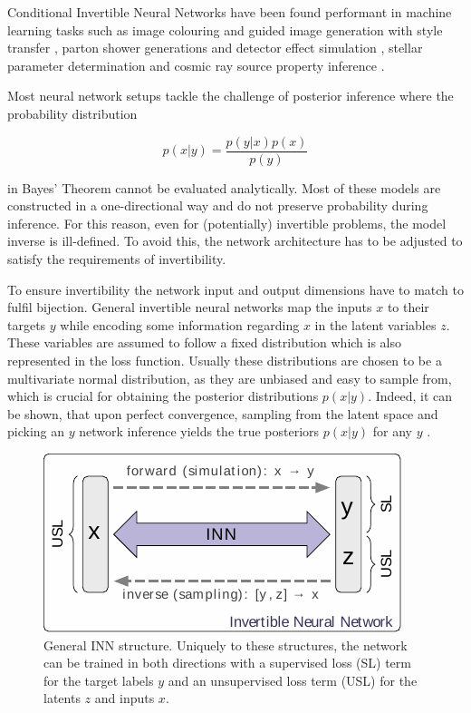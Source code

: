 
Conditional Invertible Neural Networks have been found performant in machine learning tasks such as image colouring and guided image generation with style transfer \cite{cINN_im_gen}, parton shower generations and detector effect simulation \cite{Bellagente_2020}, stellar parameter determination \cite{Ksoll_2020} and cosmic ray source property inference \cite{Bister_2022}.

Most neural network setups tackle the challenge of posterior inference where the probability distribution 

\begin{equation*}
	p(x | y) = \frac{p(y | x) p(x)}{p(y)}
\end{equation*}

in Bayes' Theorem cannot be evaluated analytically. Most of these models are constructed in a one-directional way and do not preserve probability during inference. For this reason, even for (potentially) invertible problems, the model inverse is ill-defined. To avoid this, the network architecture has to be adjusted to satisfy the requirements of invertibility.


To ensure invertibility the network input and output dimensions have to match to fulfil bijection. General invertible neural networks map the inputs $x$ to their targets $y$ while encoding some information regarding $x$ in the latent variables $z$. These variables are assumed to follow a fixed distribution which is also represented in the loss function. Usually these distributions are chosen to be a multivariate normal distribution, as they are unbiased and easy to sample from, which is crucial for obtaining the posterior distributions $p(x | y)$. Indeed, it can be shown, that upon perfect convergence, sampling from the latent space and picking an $y$ network inference yields the true posteriors $p(x | y)$ for any $y$ \cite{INN_Ardizzone}.

\begin{figure}[h!]
	\centering
	\includegraphics[width=0.6\linewidth]{figures/neural_networks/inns.pdf}
	\caption{General INN structure. Uniquely to these structures\protect\footnotemark, the network can be trained in both directions with a supervised loss (SL) term for the target labels $y$ and an unsupervised loss term (USL) for the latents $z$ and inputs $x$. \cite{INN_Ardizzone}}
	\label{fig:inn}
\end{figure}

